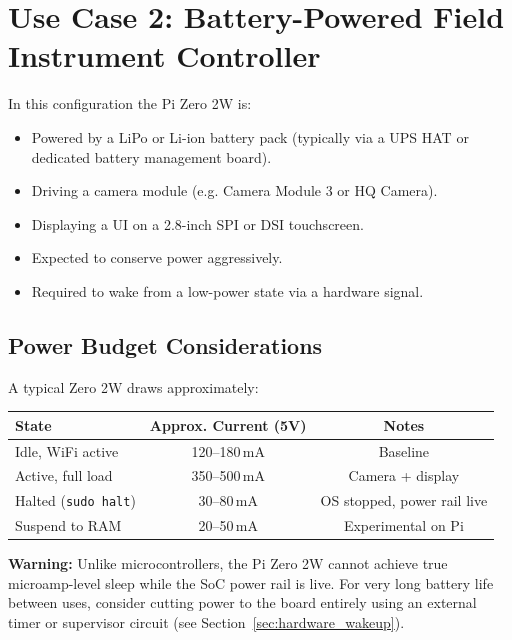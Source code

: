 \documentclass[11pt,letter]{article}
\begin{document}
\section{Use Case 2: Battery-Powered Field Instrument Controller}

In this configuration the Pi Zero 2W is:
\begin{itemize}
  \item Powered by a LiPo or Li-ion battery pack (typically via a UPS HAT or dedicated battery management board).
  \item Driving a camera module (e.g. Camera Module 3 or HQ Camera).
  \item Displaying a UI on a 2.8-inch SPI or DSI touchscreen.
  \item Expected to conserve power aggressively.
  \item Required to wake from a low-power state via a hardware signal.
\end{itemize}

\subsection{Power Budget Considerations}

A typical Zero 2W draws approximately:

\begin{center}
\begin{tabular}{lcc}
\toprule
\textbf{State} & \textbf{Approx. Current (5V)} & \textbf{Notes} \\
\midrule
Idle, WiFi active & 120--180\,mA & Baseline \\
Active, full load & 350--500\,mA & Camera + display \\
Halted (\texttt{sudo halt}) & 30--80\,mA & OS stopped, power rail live \\
Suspend to RAM & 20--50\,mA & Experimental on Pi \\
\bottomrule
\end{tabular}
\end{center}

\begin{warnbox}
\textbf{Warning:} Unlike microcontrollers, the Pi Zero 2W cannot achieve true microamp-level sleep while the SoC power rail is live. For very long battery life between uses, consider cutting power to the board entirely using an external timer or supervisor circuit (see Section~\ref{sec:hardware_wakeup}).
\end{warnbox}
\end{document}

